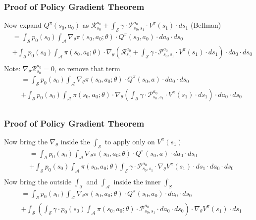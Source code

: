 \documentclass[handout]{beamer}
\begin{document}
\begin{frame}
\frametitle{Proof of Policy Gradient Theorem}
\pause
Now expand $Q^{\pi}(s_0, a_0)$ as $\mathcal{R}_{s_0}^{a_0} + \int_{\mathcal{S}} \gamma \cdot \mathcal{P}_{s_0,s_1}^{a_0} \cdot V^{\pi}(s_1) \cdot ds_1$ (Bellman)
\pause
\begin{align*}
& = \int_{\mathcal{S}} p_0(s_0) \int_{\mathcal{A}} \nabla_{\theta} \pi(s_0, a_0; \theta) \cdot Q^{\pi}(s_0, a_0) \cdot da_0 \cdot ds_0 \\
& + \int_{\mathcal{S}} p_0(s_0) \int_{\mathcal{A}} \pi(s_0, a_0; \theta) \cdot \nabla_{\theta} (\mathcal{R}_{s_0}^{a_0} + \int_{\mathcal{S}} \gamma \cdot \mathcal{P}_{s_0,s_1}^{a_0} \cdot V^{\pi}(s_1) \cdot ds_1) \cdot da_0 \cdot ds_0 \\
\end{align*}
\pause
Note: $\nabla_{\theta} \mathcal{R}_{s_0}^{a_0} = 0$, so remove that term
\pause
\begin{align*}
& = \int_{\mathcal{S}} p_0(s_0) \int_{\mathcal{A}} \nabla_{\theta} \pi(s_0, a_0; \theta) \cdot Q^{\pi}(s_0, a) \cdot da_0 \cdot ds_0 \\
& + \int_{\mathcal{S}} p_0(s_0) \int_{\mathcal{A}} \pi(s_0, a_0; \theta) \cdot \nabla_{\theta} (\int_{\mathcal{S}} \gamma \cdot \mathcal{P}_{s_0,s_1}^{a_0} \cdot V^{\pi}(s_1) \cdot ds_1) \cdot da_0 \cdot ds_0 \\
\end{align*}
\end{frame}

\begin{frame}
\frametitle{Proof of Policy Gradient Theorem}
\pause
Now bring the $\nabla_{\theta}$ inside the $\int_\mathcal{S}$ to apply only on $V^{\pi}(s_1)$
\pause
\begin{align*}
& = \int_{\mathcal{S}} p_0(s_0) \int_{\mathcal{A}} \nabla_{\theta} \pi(s_0, a_0; \theta) \cdot Q^{\pi}(s_0, a) \cdot da_0 \cdot ds_0 \\
& + \int_{\mathcal{S}} p_0(s_0) \int_{\mathcal{A}} \pi(s_0, a_0; \theta) \int_{\mathcal{S}} \gamma \cdot \mathcal{P}_{s_0,s_1}^{a_0} \cdot \nabla_{\theta} V^{\pi}(s_1) \cdot ds_1 \cdot da_0 \cdot ds_0\\
\end{align*}
\pause
Now bring the outside $\int_\mathcal{S}$ and $\int_\mathcal{A}$ inside the inner $\int_{S}$
\pause
\begin{align*}
& = \int_{\mathcal{S}} p_0(s_0) \int_{\mathcal{A}} \nabla_{\theta} \pi(s_0, a_0; \theta) \cdot Q^{\pi}(s_0, a_0) \cdot da_0 \cdot ds_0 \\
& + \int_{\mathcal{S}}  (\int_{\mathcal{S}} \gamma \cdot p_0(s_0) \int_{\mathcal{A}} \pi(s_0, a_0; \theta) \cdot \mathcal{P}_{s_0,s_1}^{a_0} \cdot d{a_0} \cdot ds_0) \cdot \nabla_{\theta}V^{\pi}(s_1) \cdot ds_1\\
\end{align*}
\end{frame}
\end{document}
